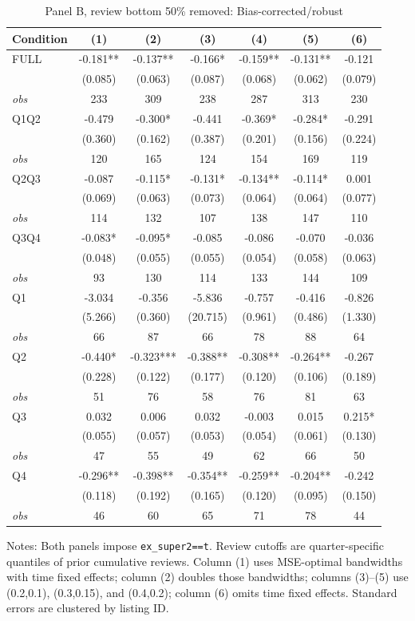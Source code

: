 \begin{table}[!htbp]
\centering
\caption{Panel B, review bottom 50\% removed: Bias-corrected/robust}
\begin{tabular}{lcccccc}
\toprule
Condition & (1) & (2) & (3) & (4) & (5) & (6) \\
\midrule
FULL & -0.181** & -0.137** & -0.166* & -0.159** & -0.131** & -0.121 \\
 & (0.085) & (0.063) & (0.087) & (0.068) & (0.062) & (0.079) \\
\textit{obs} & 233 & 309 & 238 & 287 & 313 & 230 \\
Q1Q2 & -0.479 & -0.300* & -0.441 & -0.369* & -0.284* & -0.291 \\
 & (0.360) & (0.162) & (0.387) & (0.201) & (0.156) & (0.224) \\
\textit{obs} & 120 & 165 & 124 & 154 & 169 & 119 \\
Q2Q3 & -0.087 & -0.115* & -0.131* & -0.134** & -0.114* & 0.001 \\
 & (0.069) & (0.063) & (0.073) & (0.064) & (0.064) & (0.077) \\
\textit{obs} & 114 & 132 & 107 & 138 & 147 & 110 \\
Q3Q4 & -0.083* & -0.095* & -0.085 & -0.086 & -0.070 & -0.036 \\
 & (0.048) & (0.055) & (0.055) & (0.054) & (0.058) & (0.063) \\
\textit{obs} & 93 & 130 & 114 & 133 & 144 & 109 \\
Q1 & -3.034 & -0.356 & -5.836 & -0.757 & -0.416 & -0.826 \\
 & (5.266) & (0.360) & (20.715) & (0.961) & (0.486) & (1.330) \\
\textit{obs} & 66 & 87 & 66 & 78 & 88 & 64 \\
Q2 & -0.440* & -0.323*** & -0.388** & -0.308** & -0.264** & -0.267 \\
 & (0.228) & (0.122) & (0.177) & (0.120) & (0.106) & (0.189) \\
\textit{obs} & 51 & 76 & 58 & 76 & 81 & 63 \\
Q3 & 0.032 & 0.006 & 0.032 & -0.003 & 0.015 & 0.215* \\
 & (0.055) & (0.057) & (0.053) & (0.054) & (0.061) & (0.130) \\
\textit{obs} & 47 & 55 & 49 & 62 & 66 & 50 \\
Q4 & -0.296** & -0.398** & -0.354** & -0.259** & -0.204** & -0.242 \\
 & (0.118) & (0.192) & (0.165) & (0.120) & (0.095) & (0.150) \\
\textit{obs} & 46 & 60 & 65 & 71 & 78 & 44 \\
\bottomrule
\end{tabular}
\begin{minipage}{0.98\textwidth}\footnotesize
Notes: Both panels impose \texttt{ex\_super2==t}. Review cutoffs are quarter-specific quantiles of prior cumulative reviews. Column (1) uses MSE-optimal bandwidths with time fixed effects; column (2) doubles those bandwidths; columns (3)--(5) use (0.2,0.1), (0.3,0.15), and (0.4,0.2); column (6) omits time fixed effects. Standard errors are clustered by listing ID.
\end{minipage}
\end{table}

